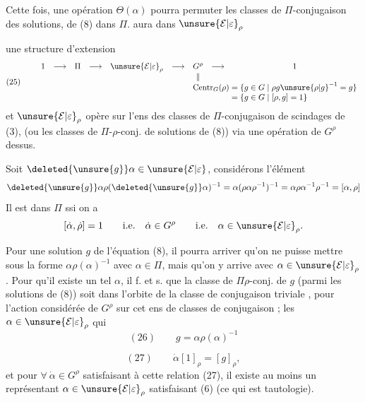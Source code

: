Cette fois, une opération $\Theta(\alpha)$ pourra permuter les classes de $\Pi$-conjugaison des  solutions, de (8) dans $\Pi$.
  aura dans $\unsure{\mathcal E|\varepsilon}_\rho$


une structure d'extension
\[
(25)\qquad
\begin{array}{ccccccccc}
1&\longrightarrow&\Pi&\longrightarrow&\unsure{\mathcal E|\varepsilon}_\rho&\longrightarrow&G^\rho&\longrightarrow&1\\
&&&&&&\Vert\\
&&&&&&\multicolumn{3}{l}{\operatorname{Centr}_G(\rho)=\{g\in G\mid\rho g\unsure{\rho|g}^{-1}=g\}}\\
&&&&&&\multicolumn{3}{l}{\phantom{\operatorname{Centr}_G(\rho)}=\{g\in G\mid[\rho,g]=1\}}
\end{array}
\]
et $\unsure{\mathcal E|\varepsilon}_\rho$ opère sur l'ens des classes de $\Pi$-conjugaison de scindages de (3), (ou les classes de $\Pi$-$\rho$-conj. de solutions de (8)) via une opération de $G^\rho$ dessus.

Soit $\deleted{\unsure{g}}\alpha\in\unsure{\mathcal E|\varepsilon}$, considérons l'élément
\[
\deleted{\unsure{g}}\alpha\rho(\deleted{\unsure{g}}\alpha)^{-1}
=\alpha(\rho\alpha\rho^{-1})^{-1}
=\alpha\rho\alpha^{-1}\rho^{-1}=[\alpha,\rho]
\]
Il est dans $\Pi$ ssi on a 
\[
[\dot\alpha,\dot\rho]=1\qquad\text{i.e.}\quad
\dot\alpha\in G^\rho\qquad\text{i.e.}\quad\alpha\in\unsure{\mathcal E|\varepsilon}_\rho.
\]

Pour une solution $g$ de l'équation (8), il pourra arriver qu'on ne puisse  mettre sous la forme  $\alpha\rho(\alpha)^{-1}$ avec $\alpha\in\Pi$, mais qu'on y arrive avec $\alpha\in\unsure{\mathcal E|\varepsilon}_\rho$.
Pour qu'il existe un tel $\alpha$, il f. et s. que la classe de $\Pi\rho$-conj. \inserted{$[g]_\rho$} de $g$ (parmi les solutions de (8)) soit dans l'orbite de la classe de conjugaison triviale \inserted{$[1]_\rho$}, pour l'action considérée de $G^\rho$ sur cet ens de classes de conjugaison ;  les $\alpha\in\unsure{\mathcal E|\varepsilon}_\rho$ qui 
\[
(26)\qquad g=\alpha\rho(\alpha)^{-1}
\]


\[
(27)\qquad\dot\alpha[1]_\rho=[g]_\rho,
\]
et pour $\forall\ \dot\alpha\in G^\rho$ satisfaisant à cette relation (27), il existe au moins un représentant $\alpha\in\unsure{\mathcal E|\varepsilon}_\rho$ satisfaisant (6) (ce qui est  tautologie).

